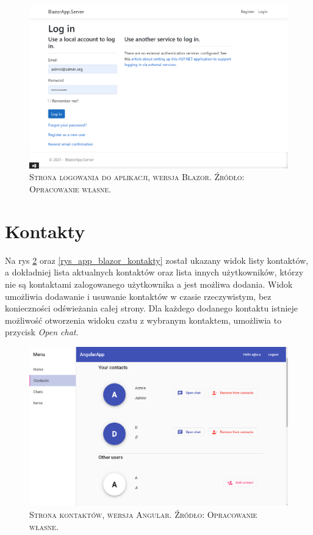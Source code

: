 \documentclass[12pt,a4paper,oneside]{book}
\newcommand{\captionT}[1]{\caption{\textsc{\footnotesize{#1}}}}
\begin{document}
\begin{figure}[H]
\centering
\includegraphics[width=1\textwidth]{images/BlazorApp/BlazorStronaLogowania.pdf}
\captionT{Strona logowania do aplikacji, wersja Blazor. Źródło: Opracowanie własne.}
\label{rys_app_blazor_login}
\end{figure}

\section{Kontakty}

Na rys \ref{rys_app_angular_kontakty} oraz \ref{rys_app_blazor_kontakty} został ukazany widok listy kontaktów, a dokładniej lista aktualnych kontaktów oraz lista innych użytkowników, którzy nie są kontaktami zalogowanego użytkownika a jest możliwa dodania. Widok umożliwia dodawanie i usuwanie kontaktów w czasie rzeczywistym, bez konieczności odświeżania całej strony. Dla każdego dodanego kontaktu istnieje możliwość otworzenia widoku czatu z wybranym kontaktem, umożliwia to przycisk \textit{Open chat}.

\begin{figure}[H]
\centering
\includegraphics[width=1\textwidth]{images/AngularApp/AngularKontakty.pdf}
\captionT{Strona kontaktów, wersja Angular. Źródło: Opracowanie własne.}
\label{rys_app_angular_kontakty}
\end{figure}
\end{document}
